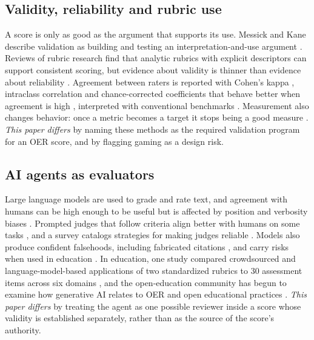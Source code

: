 \subsection{Validity, reliability and rubric use}
A score is only as good as the argument that supports its use. Messick and Kane describe validation as building and testing an interpretation-and-use argument \cite{messick1995,kane2013}. Reviews of rubric research find that analytic rubrics with explicit descriptors can support consistent scoring, but evidence about validity is thinner than evidence about reliability \cite{jonsson2007,reddy2010}. Agreement between raters is reported with Cohen's kappa \cite{cohen1960}, intraclass correlation \cite{shrout1979,koo2016} and chance-corrected coefficients that behave better when agreement is high \cite{gwet2008}, interpreted with conventional benchmarks \cite{landis1977}. Measurement also changes behavior: once a metric becomes a target it stops being a good measure \cite{campbell1979,strathern1997}. \emph{This paper differs} by naming these methods as the required validation program for an OER score, and by flagging gaming as a design risk.

\subsection{AI agents as evaluators}
Large language models are used to grade and rate text, and agreement with humans can be high enough to be useful but is affected by position and verbosity biases \cite{zheng2023,wang2024}. Prompted judges that follow criteria align better with humans on some tasks \cite{liu2023}, and a survey catalogs strategies for making judges reliable \cite{gu2024}. Models also produce confident falsehoods, including fabricated citations \cite{ji2023}, and carry risks when used in education \cite{bender2021,kasneci2023,zawacki2019}. In education, one study compared crowdsourced and language-model-based applications of two standardized rubrics to 30 assessment items across six domains \cite{moore2024}, and the open-education community has begun to examine how generative AI relates to OER and open educational practices \cite{bozkurt2023}. \emph{This paper differs} by treating the agent as one possible reviewer inside a score whose validity is established separately, rather than as the source of the score's authority.
